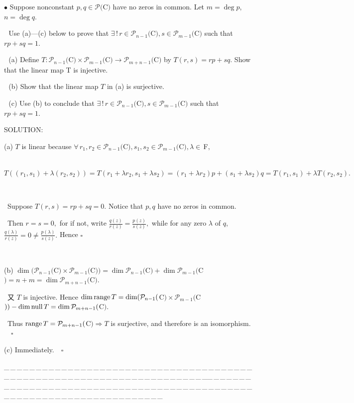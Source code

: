 \documentclass[a4paper, 11pt, UTF8]{article}
\def\range{\textup{range}\,}
\def\null{\textup{null\,}}
\def\Po{\mathcal{P}}
\def\Fbfc{$\,{\timesbf F}$}
\begin{document}
\begin{large}
{\small $\bullet$} {\timessl\Large 
Suppose nonconstant $p,q\in\Po(${\timesbf C}$)$ have no zeros in common. Let $m = \deg p$, $n = \deg q$.}\par\,\,
{\timessl\Large Use {\timesnr(a)—(c)} below to prove that $\exists\,!\,r\in\Po_{n-1}(${\timesbf C}$),s\in\Po_{m-1}(${\timesbf C}$)$ such that $rp + sq = 1.$}\par\,\,
(a) {\timessl Define $T:\Po_{n-1}(${\timesbf C}$) \times \Po_{m-1}(${\timesbf C}$)\rightarrow\Po_{m+n-1}(${\timesbf C}$)$ by $T(r, s) = rp + sq.$
Show that the linear map T is injective.
}\par\,\,
(b) {\timessl Show that the linear map $T$ in {\timesnr(a)} is surjective.}\par\,\,
(c) {\timessl Use {\timesnr(b)} to conclude that $\exists\,!\,r\in\Po_{n-1}(${\timesbf C}$),s\in\Po_{m-1}(${\timesbf C}$)$ such that $rp + sq = 1.$}\par
{\timesbf S\footnotesize{OLUTION:}}\par\quad
(a) $T$ is linear because $\forall\,r_1,r_2\in\Po_{n-1}(${\timesbf C}$),s_1,s_2\in\Po_{m-1}(${\timesbf C}$),\lambda\in\Fbfc,$\par\qquad\,
$T((r_1,s_1)+\lambda(r_2,s_2))=T(r_1+\lambda r_2,s_1+\lambda s_2)=(r_1+\lambda r_2)p+(s_1+\lambda s_2)q=T(r_1,s_1)+\lambda T(r_2,s_2).$\par{\tiny\,\par}\qquad\,
Suppose $T(r,s)=rp+sq=0.$ Notice that $p,q$ have no zeros in common.\par\qquad\,
Then $r=s=0,$ for if not, write $\displaystyle\frac{q(z)}{r(z)}=\frac{p(z)}{s(z)},$ while for any zero $\lambda$ of $q$, $\displaystyle\frac{q(\lambda)}{r(z)}=0\neq\frac{p(\lambda)}{s(z)}.$ Hence $\square$\par{\tiny\,\par}\quad
(b) $\dim(\Po_{n-1}(${\timesbf C}$)\times\Po_{m-1}(${\timesbf C}$))=\dim\Po_{n-1}(${\timesbf C}$)+\dim\Po_{m-1}(${\timesbf C}$)=n+m=\dim\Po_{m+n-1}(${\timesbf C}$).$\par\qquad\,
又 $T$ is injective. Hence $\dim\range T=\dim(\Po_{n-1}(${\timesbf C}$)\times\Po_{m-1}(${\timesbf C}$))-\dim\null T=\dim\Po_{m+n-1}(${\timesbf C}$).$\par\qquad\,
Thus $\range T=\Po_{m+n-1}(${\timesbf C}$)\Rightarrow T$ is surjective, and therefore is an isomorphism.$\quad\square$\par\quad
(c) Immediately.$\quad\square$\par
{\tiny \_\,\_\,\_\,\_\,\_\,\_\,\_\,\_\,\_\,\_\,\_\,\_\,\_\,\_\,\_\,\_\,\_\,\_\,\_\,\_\,\_\,\_\,\_\,\_\,\_\,\_\,\_\,\_\,\_\,\_\,\_\,\_\,\_\,\_\,\_\,\_\,\_\,\_\,\_\,\_\,\_\,\_\,\_\,\_\,\_\,\_\,\_\,\_\,\_\,\_\,\_\,\_\,\_\,\_\,\_\,\_\,\_\,\_\,\_\,\_\,\_\,\_\,\_\,\_\,\_\,\_\,\_\,\_\,\_\,\_\,\_\_\,\_\,\_\,\_\,\_\,\_\,\_\,\_\,\_\,\_\,\_\,\_\,\_\,\_\,\_\,\_\,\_\,\_\,\_\,\_\,\_\,\_\,\_\,\_\,\_\,\_\,\_\,\_\,\_\,\_\,\_\,\_\,\_\,\_\,\_\,\_\,\_\,\_\,\_\,\_\,\_\,\_\,\_\,\_\,\_\,\_\,\_\,\_\,\_\,\_\,\_\,\_\,\_\,\_\,\_\,\_\,\_\,\_\,\_\,\_\,\_\,\_\,\_\,\_\,\_\,\_\,\_\,\_\,\_\,\_\,\_}\par


\end{large}
\end{document}
